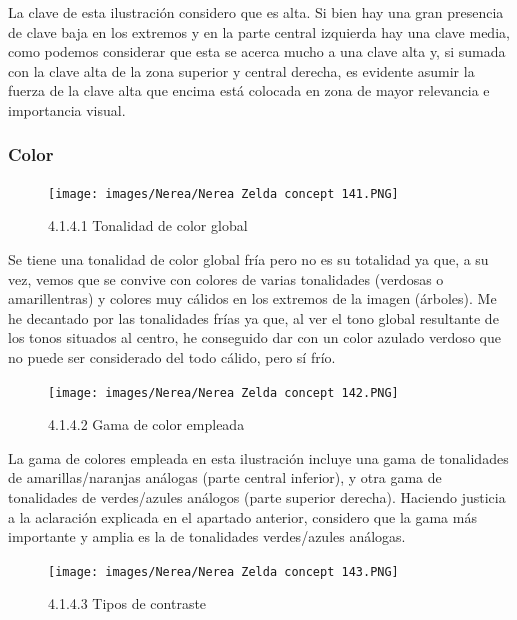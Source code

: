 \documentclass[12pt]{article}
\begin{document}
    La clave de esta ilustración considero que es alta. Si bien hay una gran presencia de clave baja en los extremos y en la parte central izquierda hay una clave media, como podemos considerar que esta se acerca mucho a una clave alta y, si sumada con la clave alta de la zona superior y central derecha, es evidente asumir la fuerza de la clave alta que encima está colocada en zona de mayor relevancia e importancia visual.


        \subsubsection{Color}


    \begin{figure}[H]
      \centering
      \texttt{[image: images/Nerea/Nerea Zelda concept 141.PNG]}
      \caption{\small 4.1.4.1 Tonalidad de color global}
    \end{figure}

    Se tiene una tonalidad de color global fría pero no es su totalidad ya que, a su vez, vemos que se convive con colores de varias tonalidades (verdosas o amarillentras) y colores muy cálidos en los extremos de la imagen (árboles). Me he decantado por las tonalidades frías ya que, al ver el tono global resultante de los tonos situados al centro, he conseguido dar con un color azulado verdoso que no puede ser considerado del todo cálido, pero sí frío.

    \begin{figure}[H]
      \centering
      \texttt{[image: images/Nerea/Nerea Zelda concept 142.PNG]}
      \caption{\small 4.1.4.2 Gama de color empleada}
    \end{figure}

    La gama de colores empleada en esta ilustración incluye una gama de tonalidades de amarillas/naranjas análogas (parte central inferior),  y otra gama de tonalidades de verdes/azules análogos (parte superior derecha). Haciendo justicia a la aclaración explicada en el apartado anterior, considero que la gama más importante y amplia es la de tonalidades verdes/azules análogas.

    \begin{figure}[H]
      \centering
      \texttt{[image: images/Nerea/Nerea Zelda concept 143.PNG]}
      \caption{\small 4.1.4.3 Tipos de contraste}
    \end{figure}
\end{document}
